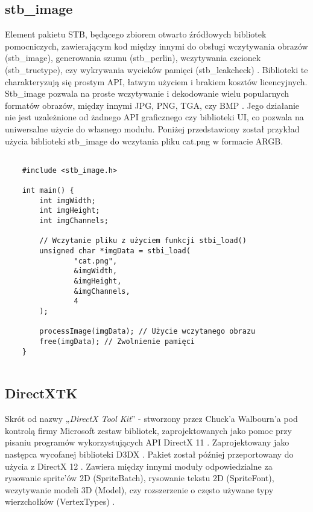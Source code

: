 \subsection{stb\_image}

Element pakietu STB, będącego zbiorem otwarto źródłowych bibliotek
pomocniczych, zawierającym kod między innymi do obsługi wczytywania
obrazów (stb\_image), generowania szumu (stb\_perlin), wczytywania
czcionek (stb\_truetype), czy wykrywania wycieków pamięci
(stb\_leakcheck) \cite{github:stb:2024}. Biblioteki te charakteryzują się prostym API,
łatwym użyciem i brakiem kosztów licencyjnych. Stb\_image pozwala na proste wczytywanie i dekodowanie wielu popularnych
formatów obrazów, między innymi JPG, PNG, TGA, czy BMP \cite{github:stb:2024}. Jego
działanie nie jest uzależnione od żadnego API graficznego czy biblioteki
UI, co pozwala na uniwersalne użycie do własnego modułu. Poniżej przedstawiony został przykład użycia biblioteki stb\_image do
wczytania pliku cat.png w formacie ARGB.

\begin{lstlisting}[caption={Przykład użycia stb\_image (oryginalna treść)}, label={lst:stb_image}]
	
	#include <stb_image.h>
	
	int main() {
		int imgWidth;
		int imgHeight;
		int imgChannels;
		
		// Wczytanie pliku z użyciem funkcji stbi_load()
		unsigned char *imgData = stbi_load(
				"cat.png", 
				&imgWidth, 
				&imgHeight, 
				&imgChannels, 
				4
		);
		
		processImage(imgData); // Użycie wczytanego obrazu
		free(imgData); // Zwolnienie pamięci
	}
	
\end{lstlisting}

\subsection{DirectXTK}

Skrót od nazwy „\emph{DirectX Tool Kit}'' - stworzony przez Chuck'a
Walbourn'a pod kontrolą firmy Microsoft zestaw bibliotek,
zaprojektowanych jako pomoc przy pisaniu programów wykorzystujących API
DirectX 11 \cite{github:directxtk:2024}. Zaprojektowany jako następca wycofanej biblioteki
D3DX \cite{walbourn:directxtk:2024}. Pakiet został później przeportowany do użycia z DirectX
12 \cite{github:directxtk12:2024}. Zawiera między innymi moduły odpowiedzialne za rysowanie
sprite'ów 2D (SpriteBatch), rysowanie tekstu 2D (SpriteFont),
wczytywanie modeli 3D (Model), czy rozszerzenie o często używane typy
wierzchołków (VertexTypes) \cite{walbourn:directxtk:2024}.

